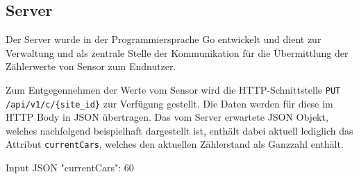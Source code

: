 \subsection{Server}\label{ch:Umsetzung_Server}

Der Server wurde in der Programmiersprache Go entwickelt und dient zur Verwaltung und als zentrale Stelle der Kommunikation für die Übermittlung der Zählerwerte von Sensor zum Endnutzer.

Zum Entgegennehmen der Werte vom Sensor wird die HTTP-Schnittstelle \lstinline|PUT /api/v1/c/{site_id}| zur Verfügung gestellt.
Die Daten werden für diese im HTTP Body in JSON übertragen.
Das vom Server erwartete JSON Objekt, welches nachfolgend beispielhaft dargestellt ist, enthält dabei aktuell lediglich das Attribut \lstinline|currentCars|, welches den aktuellen Zählerstand als Ganzzahl enthält.

\lstset{language=json, numbers=none}
\begin{center}
    \begin{mylisting}{Input JSON}
{
    "currentCars": 60
}
    \end{mylisting}
\end{center}

